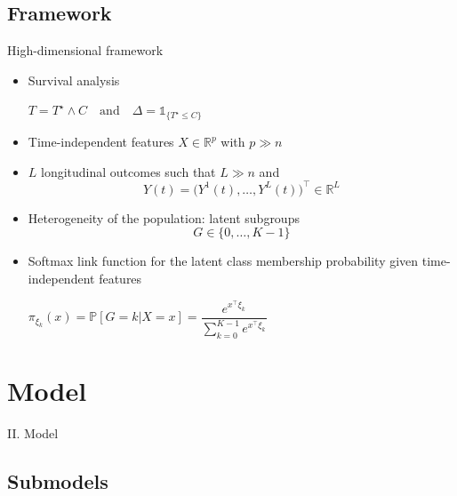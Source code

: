 \documentclass{beamer}
\newcommand{\R}{\mathbb R}
\renewcommand{\P}{\mathds{P}}
\newcommand{\ind}[1]{\mathds{1}_{#1}}
\renewcommand{\P}{\mathds P}
\begin{document}
\subsection{Framework}

\begin{frame}{High-dimensional framework}

\small
\begin{itemize}
  \item Survival analysis
  \begin{center}
  $T = T^\star \wedge C \quad \text{and} \quad \Delta = \ind{\{T^\star \leq C\}}$
  \end{center}
  \item Time-independent features $X \in \R^p$ with $p \gg n$
  \item $L$ longitudinal outcomes such that $L \gg n$ and \[Y(t) = \big(Y^1(t), \ldots, Y^L(t) \big)^\top \in \R^L\]
  \item Heterogeneity of the population: latent subgroups \[G \in \{ 0, \ldots, K-1\}\]
  \item Softmax link function for the latent class membership probability given time-independent features
  \begin{center}
  $\pi_{\xi_k}(x) = \P[G=k|X=x] = \dfrac{e^{x^\top\xi_k}}{\sum_{k=0}^{K-1}e^{x^\top\xi_k}}$
  \end{center}
\end{itemize}

\end{frame}

\section{Model}

\begin{frame}[noframenumbering]
\Large \centering
\textcolor{blue_pres}{II.} Model
\end{frame}

\subsection{Submodels}
\end{document}
